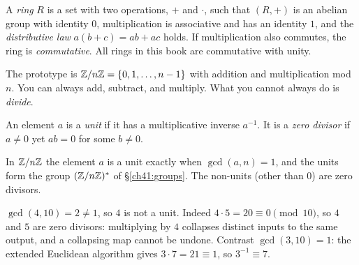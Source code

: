 \begin{definition}
\label{ch41:def-ring}
A \emph{ring} $R$ is a set with two operations, $+$ and $\cdot$, such that
$(R,+)$ is an abelian group with identity $0$, multiplication is associative and
has an identity $1$, and the \emph{distributive law} $a(b+c)=ab+ac$ holds. If
multiplication also commutes, the ring is \emph{commutative}. All rings in this
book are commutative with unity.
\end{definition}

The prototype is $\mathbb{Z}/n\mathbb{Z}=\{0,1,\dots,n-1\}$ with addition and multiplication mod
$n$. You can always add, subtract, and multiply. What you cannot always do is
\emph{divide}.

\begin{definition}
\label{ch41:def-unit}
An element $a$ is a \emph{unit} if it has a multiplicative inverse $a^{-1}$. It is
a \emph{zero divisor} if $a\neq 0$ yet $ab=0$ for some $b\neq 0$.
\end{definition}

In $\mathbb{Z}/n\mathbb{Z}$ the element $a$ is a unit exactly when $\gcd(a,n)=1$, and the units
form the group $(\mathbb{Z}/n\mathbb{Z})^{*}$ of \S\ref{ch41:groups}. The non-units (other than $0$)
are zero divisors.

\begin{example}
\label{ch41:ex-zerodiv}
$\gcd(4,10)=2\neq1$, so $4$ is not a unit. Indeed $4\cdot 5 = 20 \equiv 0 \pmod
{10}$, so $4$ and $5$ are zero divisors: multiplying by $4$ collapses distinct
inputs to the same output, and a collapsing map cannot be undone. Contrast
$\gcd(3,10)=1$: the extended Euclidean algorithm gives $3\cdot 7 = 21 \equiv 1$,
so $3^{-1}\equiv 7$.
\end{example}

